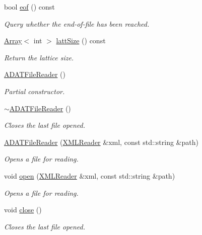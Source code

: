 \begin{DoxyCompactItemize}
bool \mbox{\hyperlink{group__qio_ga22337f3cfe1b2ecd1ead8d2755a1f9ca}{eof}} () const
\begin{DoxyCompactList}\small\item\em Query whether the end-\/of-\/file has been reached. \end{DoxyCompactList}\item 
\mbox{\hyperlink{classXMLArray_1_1Array}{Array}}$<$ int $>$ \mbox{\hyperlink{group__qio_ga3498ab9948d446056dee8f2808e05c78}{latt\+Size}} () const
\begin{DoxyCompactList}\small\item\em Return the lattice size. \end{DoxyCompactList}\item 
\mbox{\hyperlink{classADATIO_1_1ADATFileReader_ga800c009d1400eb965cc04a7f90bf4f24}{A\+D\+A\+T\+File\+Reader}} ()
\begin{DoxyCompactList}\small\item\em Partial constructor. \end{DoxyCompactList}\item 
\mbox{\hyperlink{classADATIO_1_1ADATFileReader_ga54a5eea68d2a1c6f5b748f6ba75b7d22}{$\sim$\+A\+D\+A\+T\+File\+Reader}} ()
\begin{DoxyCompactList}\small\item\em Closes the last file opened. \end{DoxyCompactList}\item 
\mbox{\hyperlink{classADATIO_1_1ADATFileReader_ga096a7060d69fd109067404e75f8a06ee}{A\+D\+A\+T\+File\+Reader}} (\mbox{\hyperlink{classADATXML_1_1XMLReader}{X\+M\+L\+Reader}} \&xml, const std\+::string \&path)
\begin{DoxyCompactList}\small\item\em Opens a file for reading. \end{DoxyCompactList}\item 
void \mbox{\hyperlink{classADATIO_1_1ADATFileReader_ga2b2ac967129dfd2d61a79e36034b400f}{open}} (\mbox{\hyperlink{classADATXML_1_1XMLReader}{X\+M\+L\+Reader}} \&xml, const std\+::string \&path)
\begin{DoxyCompactList}\small\item\em Opens a file for reading. \end{DoxyCompactList}\item 
void \mbox{\hyperlink{classADATIO_1_1ADATFileReader_ga8b86dba1600272d26539815146f04078}{close}} ()
\begin{DoxyCompactList}\small\item\em Closes the last file opened. \end{DoxyCompactList}\item 

\end{DoxyCompactItemize}
